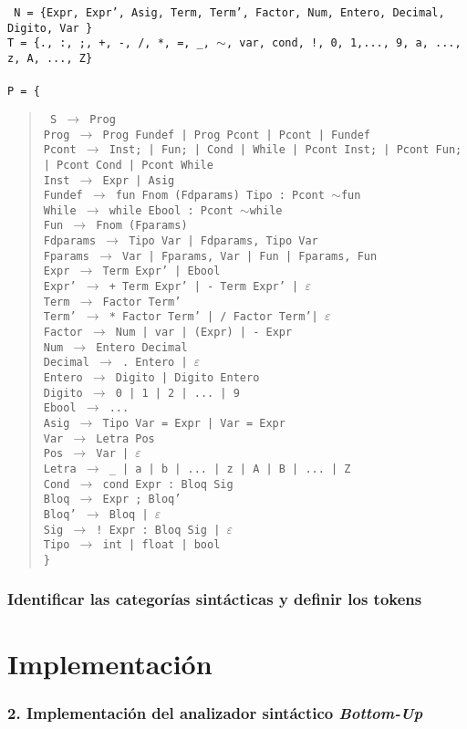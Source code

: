\documentclass[12pt]{article}
\begin{document}
\noindent
\noindent
\texttt{
  \noindent
N = \{Expr, Expr', Asig, Term, Term', Factor, Num, Entero, Decimal, Digito, Var \}\\
T = \{., :, ;, +, -, /, *, =, \_, $\sim$, var, cond, !, 0, 1,..., 9, a, ..., z, A, ..., Z\}\\ \\ 
P = \{}
\begin{quote}
  \texttt{
    S $\to$ Prog\\
    Prog $\to$ Prog Fundef | Prog Pcont | Pcont | Fundef\\
    Pcont $\to$ Inst; | Fun; | Cond | While | Pcont Inst; | Pcont Fun; | Pcont Cond | Pcont While\\
    Inst $\to$ Expr | Asig\\
    Fundef $\to$ fun Fnom (Fdparams) Tipo : Pcont $\sim$fun\\
    While $\to$ while Ebool : Pcont $\sim$while\\    
    Fun $\to$ Fnom (Fparams)\\
    Fdparams $\to$ Tipo Var | Fdparams, Tipo Var\\
    Fparams $\to$ Var | Fparams, Var | Fun | Fparams, Fun\\
    Expr  $\to$ Term Expr' | Ebool \\
    Expr' $\to$ + Term Expr' | - Term Expr' | $\varepsilon$ \\
    Term  $\to$ Factor Term' \\
    Term' $\to$ * Factor Term' | / Factor Term'| $\varepsilon$ \\
    Factor $\to$ Num | var | (Expr) | - Expr \\
    Num $\to$ Entero Decimal \\
    Decimal $\to$ . Entero | $\varepsilon$ \\
    Entero $\to$ Digito | Digito Entero \\
    Digito $\to$ 0 | 1 | 2 | ... | 9 \\
    Ebool $\to$ ... \\
    Asig $\to$ Tipo Var = Expr | Var = Expr \\
    Var  $\to$ Letra Pos \\
    Pos  $\to$ Var | $\varepsilon$ \\
    Letra $\to$ \_ | a | b | ... | z | A | B | ... | Z \\
    Cond $\to$ cond Expr : Bloq Sig \\
    Bloq $\to$ Expr ; Bloq'\\
    Bloq' $\to$ Bloq | $\varepsilon$\\ 
    Sig $\to$ ! Expr : Bloq Sig | $\varepsilon$ \\
    Tipo $\to$ int | float | bool \\
    \}
}
 
\end{quote}

\subsubsection*{Identificar las categorías sintácticas y definir los tokens}

\section{Implementación}
\subsubsection*{2. Implementación del analizador sintáctico \textit{Bottom-Up}}
\end{document}

